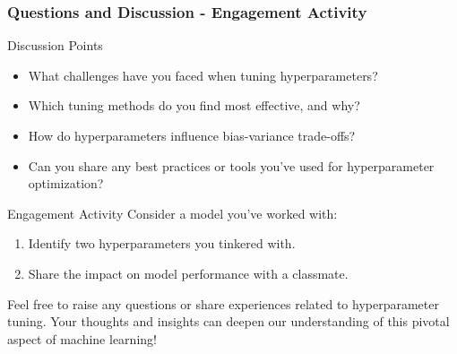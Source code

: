 \documentclass[aspectratio=169]{beamer}
\begin{document}
\begin{frame}[fragile]
  \frametitle{Questions and Discussion - Engagement Activity}
  
  \begin{block}{Discussion Points}
  \begin{itemize}
    \item What challenges have you faced when tuning hyperparameters?
    \item Which tuning methods do you find most effective, and why?
    \item How do hyperparameters influence bias-variance trade-offs?
    \item Can you share any best practices or tools you've used for hyperparameter optimization?
  \end{itemize}
  \end{block}
  
  \begin{block}{Engagement Activity}
    Consider a model you've worked with:
    \begin{enumerate}
      \item Identify two hyperparameters you tinkered with.
      \item Share the impact on model performance with a classmate.
    \end{enumerate}
  
    Feel free to raise any questions or share experiences related to hyperparameter tuning. Your thoughts and insights can deepen our understanding of this pivotal aspect of machine learning!
  \end{block}
\end{frame}
\end{document}
